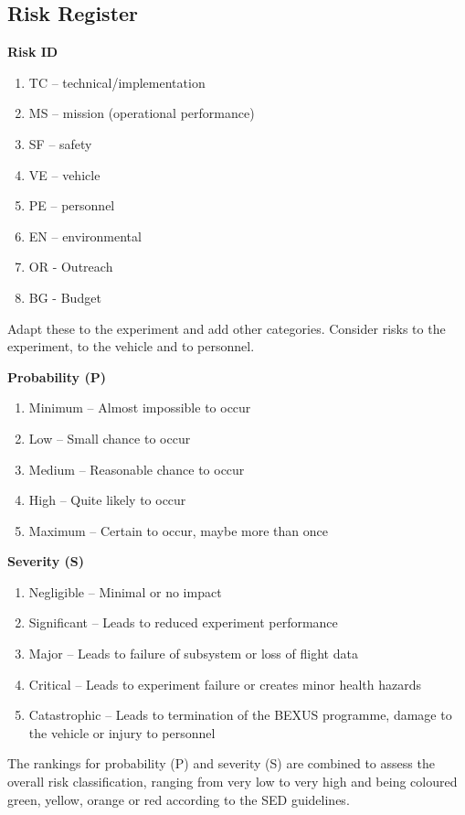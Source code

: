 \documentclass[a4paper,12pt,twoside]{article}
\begin{document}
\subsection{Risk Register}
\textbf{Risk ID}
\begin{enumerate}[label={}]
    \item TC – technical/implementation 
    \item MS – mission (operational performance) 
    \item SF – safety 
    \item VE – vehicle 
    \item PE – personnel 
    \item EN – environmental 
    \item OR - Outreach
    \item BG - Budget
\end{enumerate}

Adapt these to the experiment and add other categories. 
Consider risks to the experiment, to the vehicle and to personnel. 

\textbf{Probability (P)}
\begin{enumerate}[label=\Alph*]
    \item Minimum – Almost impossible to occur 
    \item Low – Small chance to occur 
    \item Medium – Reasonable chance to occur 
    \item High – Quite likely to occur 
    \item Maximum – Certain to occur, maybe more than once
\end{enumerate}

\textbf{Severity (S)}
\begin{enumerate}
    \item Negligible – Minimal or no impact 
    \item Significant – Leads to reduced experiment performance 
    \item Major – Leads to failure of subsystem or loss of flight data 
    \item Critical – Leads to experiment failure or creates minor health hazards 
    \item Catastrophic – Leads to termination of the BEXUS programme, damage to the vehicle or injury to personnel 
\end{enumerate}

The rankings for probability (P) and severity (S) are combined to assess the overall risk classification, ranging from very low to very high and being coloured green, yellow, orange or red according to the SED guidelines.
\end{document}
